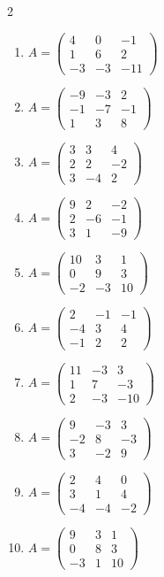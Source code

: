 \begin{multicols}{2}
\begin{enumerate}[label=\arabic*., leftmargin=*]
\item $A=\begin{pmatrix}4 & 0 & -1\\ 1 & 6 & 2\\ -3 & -3 & -11\end{pmatrix}$
\item $A=\begin{pmatrix}-9 & -3 & 2\\ -1 & -7 & -1\\ 1 & 3 & 8\end{pmatrix}$
\item $A=\begin{pmatrix}3 & 3 & 4\\ 2 & 2 & -2\\ 3 & -4 & 2\end{pmatrix}$
\item $A=\begin{pmatrix}9 & 2 & -2\\ 2 & -6 & -1\\ 3 & 1 & -9\end{pmatrix}$
\item $A=\begin{pmatrix}10 & 3 & 1\\ 0 & 9 & 3\\ -2 & -3 & 10\end{pmatrix}$
\item $A=\begin{pmatrix}2 & -1 & -1\\ -4 & 3 & 4\\ -1 & 2 & 2\end{pmatrix}$
\item $A=\begin{pmatrix}11 & -3 & 3\\ 1 & 7 & -3\\ 2 & -3 & -10\end{pmatrix}$
\item $A=\begin{pmatrix}9 & -3 & 3\\ -2 & 8 & -3\\ 3 & -2 & 9\end{pmatrix}$
\item $A=\begin{pmatrix}2 & 4 & 0\\ 3 & 1 & 4\\ -4 & -4 & -2\end{pmatrix}$
\item $A=\begin{pmatrix}9 & 3 & 1\\ 0 & 8 & 3\\ -3 & 1 & 10\end{pmatrix}$

\end{enumerate}
\end{multicols}

